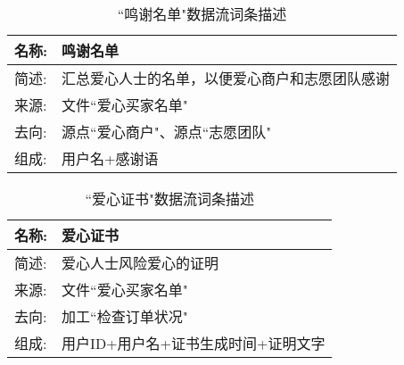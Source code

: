 \begin{table}[H]  
    \caption{``鸣谢名单"数据流词条描述}  
    \begin{center}  
        \begin{tabular}{l p{11cm}} 
            \hline
            \quad 名称:  &  鸣谢名单 \\
            \hline
            \quad 简述:  & 汇总爱心人士的名单，以便爱心商户和志愿团队感谢\\
            \hline
            \quad 来源:  & 文件``爱心买家名单" \\
            \hline
            \quad 去向:  & 源点``爱心商户"、源点``志愿团队" \\
            \hline
            \quad 组成:  & 用户名+感谢语 \\
            \hline
        \end{tabular}
        \label{tab1}
    \end{center}
    \end{table}
    
    
    \begin{table}[H]  
    \caption{``爱心证书"数据流词条描述}  
    \begin{center}  
        \begin{tabular}{l p{11cm}} 
            \hline
            \quad 名称:  &   爱心证书 \\
            \hline
            \quad 简述:  & 爱心人士风险爱心的证明 \\
            \hline
            \quad 来源:  & 文件``爱心买家名单" \\
            \hline
            \quad 去向:  & 加工``检查订单状况" \\
            \hline
            \quad 组成:  & 用户ID+用户名+证书生成时间+证明文字  \\
            \hline
        \end{tabular}
        \label{tab1}
    \end{center}
    \end{table}
    
    
    